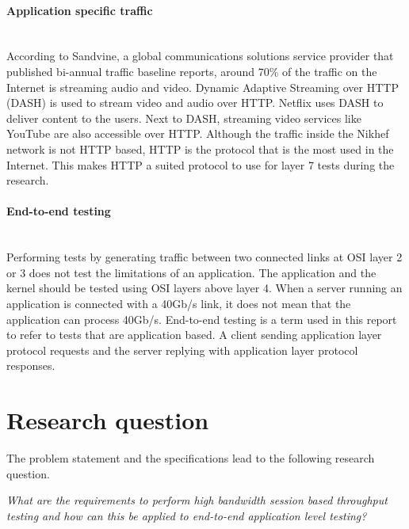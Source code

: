 \paragraph{Application specific traffic}\mbox{} \\
According to Sandvine\cite{phenomena_2017}, a global communications solutions service provider that published bi-annual traffic baseline reports, around 70\% of the traffic on the Internet is streaming audio and video. 
Dynamic Adaptive Streaming over HTTP (DASH)\cite{dash} is used to stream video and audio over HTTP. 
Netflix uses DASH to deliver content to the users. 
Next to DASH, streaming video services like YouTube are also accessible over HTTP.
Although the traffic inside the Nikhef network is not HTTP based, HTTP is the protocol that is the most used in the Internet. 
This makes HTTP a suited protocol to use for layer 7 tests during the research.  

\paragraph{End-to-end testing}\label{par:endtoend}\mbox{}\\
Performing tests by generating traffic between two connected links at OSI layer 2 or 3 does not test the limitations of an application. 
The application and the kernel should be tested using OSI layers above layer 4. 
When a server running an application is connected with a 40Gb/s link, it does not mean that the application can process 40Gb/s. 
End-to-end testing is a term used in this report to refer to tests that are application based.
A client sending application layer protocol requests and the server replying with application layer protocol responses.  

\section{Research question}\label{sec:researchquestion}
The problem statement and the specifications lead to the following research question.

\begin{center}
\textit{What are the requirements to perform high bandwidth session based throughput testing and how can this be applied to end-to-end application level testing?} \\
\end{center}

